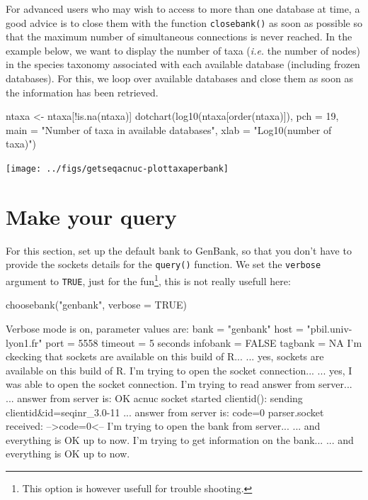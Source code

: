 \documentclass{article}
\begin{document}
For advanced users who may wish to access to more than one database at time, a good advice
is to close them with the function \texttt{closebank()} as soon as possible so that the maximum
number of simultaneous connections is never reached. In the example below, we want to
display the number of taxa (\textit{i.e.} the number of nodes) in the species taxonomy associated
with each available database (including frozen databases). For this, we loop over available databases and 
close them as soon as the information has been retrieved.

\begin{Schunk}
\end{Schunk}
\begin{Schunk}
\begin{Sinput}
 ntaxa <- ntaxa[!is.na(ntaxa)]
 dotchart(log10(ntaxa[order(ntaxa)]), pch = 19,
 main = "Number of taxa in available databases",
 xlab = "Log10(number of taxa)")
\end{Sinput}
\end{Schunk}
\texttt{[image: ../figs/getseqacnuc-plottaxaperbank]}

\section{Make your query}

For this section, set up the default bank to GenBank, so that you don't have 
to provide the sockets details for the \texttt{query()} function. We set the
\texttt{verbose} argument to \texttt{TRUE}, just for the fun\footnote{%
This option is however usefull for trouble shooting.}, this is not
really usefull here:

\begin{Schunk}
\begin{Sinput}
 choosebank("genbank", verbose = TRUE)
\end{Sinput}
\begin{Soutput}
Verbose mode is on, parameter values are:
  bank =  "genbank" 
  host =  "pbil.univ-lyon1.fr" 
  port =  5558 
  timeout =  5 seconds 
  infobank =  FALSE 
  tagbank =  NA 
I'm ckecking that sockets are available on this build of R...
... yes, sockets are available on this build of R.
I'm trying to open the socket connection...
... yes, I was able to open the socket connection.
I'm trying to read answer from server...
... answer from server is: OK acnuc socket started 
clientid(): sending clientid&id=seqinr_3.0-11 
... answer from server is: code=0 
parser.socket received: -->code=0<--
I'm trying to open the bank from server...
... and everything is OK up to now.
I'm trying to get information on the bank...
... and everything is OK up to now.
\end{Soutput}
\end{Schunk}
\end{document}
